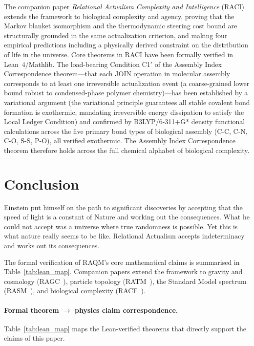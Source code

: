 \documentclass[11pt,a4paper]{article}
\theoremstyle{plain}
\theoremstyle{definition}
\theoremstyle{remark}
\begin{document}
The companion paper \emph{Relational Actualism Complexity and Intelligence}
(RACI)~\citep{Sandeman2026RACI} extends the framework to biological complexity and
agency, proving that the Markov blanket isomorphism and the thermodynamic steering
cost bound are structurally grounded in the same actualization criterion, and
making four empirical predictions including a physically derived constraint on the
distribution of life in the universe. Core theorems in RACI have been formally
verified in Lean~4/Mathlib. The load-bearing Condition C1$'$ of the Assembly Index
Correspondence theorem---that each JOIN operation in molecular assembly corresponds
to at least one irreversible actualization event (a coarse-grained lower bound
robust to condensed-phase polymer chemistry)---has been established by a variational
argument (the variational principle guarantees all stable covalent bond formation is
exothermic, mandating irreversible energy dissipation to satisfy the Local Ledger
Condition) and confirmed by B3LYP/6-311+G* density functional calculations across
the five primary bond types of biological assembly (C-C, C-N, C-O, S-S, P-O), all
verified exothermic. The Assembly Index Correspondence theorem therefore holds
across the full chemical alphabet of biological complexity.

\section{Conclusion}
\label{sec:conclusion}

Einstein put himself on the path to significant discoveries by accepting that the
speed of light is a constant of Nature and working out the consequences. What he
could not accept was a universe where true randomness is possible. Yet this is what
nature really seems to be like. Relational Actualism accepts indeterminacy and
works out its consequences.

The formal verification of RAQM's core mathematical claims is summarised in
Table~\ref{tab:lean_map}. Companion papers extend the framework to gravity
and cosmology (RAGC~\citep{Sandeman2026RAGC}), particle topology
(RATM~\citep{Sandeman2026RATM}), the Standard Model spectrum
(RASM~\citep{Sandeman2026RASM}), and biological complexity
(RACF~\citep{Sandeman2026RACF}).





\paragraph{Formal theorem $\to$ physics claim correspondence.}
Table~\ref{tab:lean_map} maps the Lean-verified theorems that directly
support the claims of this paper.
\end{document}
